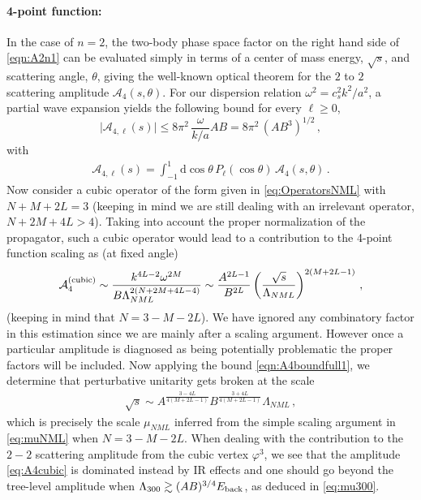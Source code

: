 \documentclass[12pt]{article}
\newcommand{\A}{\mathcal{A}}
\def\ba{\begin{eqnarray}}
\def\ea{\end{eqnarray}}
\def\d{\mathrm{d}}
\def\({\left(}
\def\){\right)}
\def\A{\mathcal{A}}
\begin{document}
\paragraph{4-point function:}
In the case of $n=2$, the two-body phase space factor on the right hand side of \eqref{eqn:A2n1} can be evaluated simply in terms of a center of mass energy, $\sqrt{s}$, and scattering angle, $\theta$, giving the well-known optical theorem for the $2$ to $2$ scattering amplitude $\A_4 (s, \theta)$. For our dispersion relation $\omega^2= c_s^2 k^2/a^2$, a partial wave expansion yields the following bound for every $\ell\ge0$,
\begin{equation}
\Big|  \A_{4,\ell} (s) \Big| \leq 8 \pi^2\,  \frac{\omega}{k/a} A B = 8 \pi^2 \, (AB^3)^{1/2}\,,
\label{eqn:A4boundfull1}
\end{equation}
with
\ba
 \A_{4,\ell} (s) = \int_{-1}^1 \d\cos \theta \, P_{\ell} (\cos \theta) \, \A_4 (s, \theta)\,.
\ea
Now consider a cubic operator  of the form given in \eqref{eq:OperatorsNML} with $N+M+2L=3$ (keeping in mind we are still dealing with an irrelevant operator,  $N+2M+4L> 4$). Taking into account the proper normalization of the propagator, such a cubic operator would lead to a contribution to the 4-point function  scaling as (at fixed angle)
\ba
\label{eq:A4cubic}
\A^{\rm (cubic)}_4 \sim \frac{k^{4L-2}\omega^{2M}}{B\Lambda^{2(N+2M+4L-4)}_{NML}}\sim \frac{A^{2L-1}}{B^{2L}} \(\frac{\sqrt{s}}{\Lambda_{NML}}\)^{2(M+2L-1)}\,,
\ea
(keeping in mind that $N=3-M-2L$). We have ignored any combinatory factor in this estimation since we are mainly after  a scaling argument. However once a  particular amplitude is diagnosed as being potentially problematic the proper factors will be  included.
Now applying the bound \eqref{eqn:A4boundfull1}, we determine that perturbative unitarity gets broken at the scale
\ba
\sqrt{s}\sim A^{\frac{3-4L}{4(M+2L-1)}} B^{\frac{3+4L}{4(M+2L-1)}} \Lambda_{NML}\,,
\ea
which is precisely the scale $\mu_{NML}$ inferred from the simple scaling argument in \eqref{eq:muNML} when $N=3-M-2L$. When dealing with the contribution to the $2-2$ scattering amplitude from the cubic vertex $\varphi^3$, we see that the amplitude \eqref{eq:A4cubic} is dominated instead by IR effects and one should go beyond the tree-level amplitude when  $\Lambda_{300}\gtrsim (AB)^{3/4} E_{\rm back}$, as deduced in \eqref{eq:mu300}. \\
\end{document}
